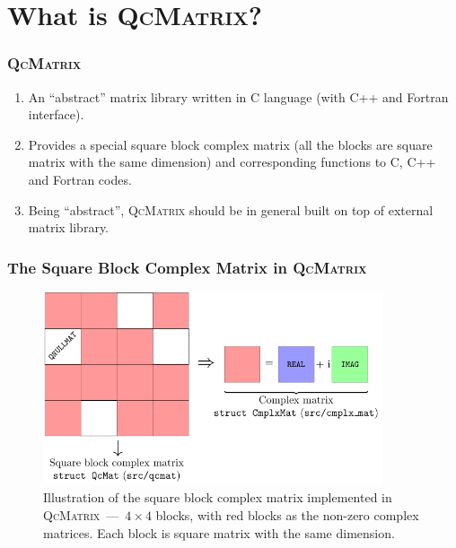 \documentclass[10pt]{beamer}
\begin{document}
{{%

\section{What is \textsc{QcMatrix}?}

\begin{frame}
  \frametitle<presentation>{\textsc{QcMatrix}}
  \begin{enumerate}
    \item An ``abstract'' matrix library written in C language (with C++
      and Fortran interface).
    \item Provides a special square block complex matrix (all the blocks
      are square matrix with the same dimension) and corresponding functions
      to C, C++ and Fortran codes.
    \item Being ``abstract'', \textsc{QcMatrix} should be in general built
      on top of external matrix library.
  \end{enumerate}
\end{frame}

\begin{frame}
  \frametitle<presentation>{The Square Block Complex Matrix in \textsc{QcMatrix}}
  \begin{figure}[htbp]
    \centering
    \includegraphics[width=10cm]{block_cmplx.pdf}
    \caption{Illustration of the square block complex matrix implemented in
      \textsc{QcMatrix}~---~$4\times 4$ blocks, with red blocks as the non-zero
      complex matrices. Each block is square matrix with the same dimension.}
    \label{fig-block-cmplx}
  \end{figure}
\end{frame}

}}
\end{document}
